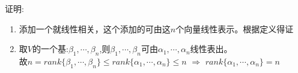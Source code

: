 证明:
\begin{enumerate}
    \item 添加一个就线性相关，这个添加的可由这$n$个向量线性表示。根据定义得证
    \item 取$V$的一个基:$\beta_1, \cdots, \beta_n$,则$\beta_1, \cdots, \beta_n$可由$\alpha_1, \cdots, \alpha_n$线性表出。\\
    故$n = rank\{\beta_1, \cdots, \beta_n\} \leq rank\{\alpha_1, \cdots, \alpha_n\} \leq n$ $\Rightarrow$ $rank\{\alpha_1, \cdots, \alpha_n\} = n$
\end{enumerate}
